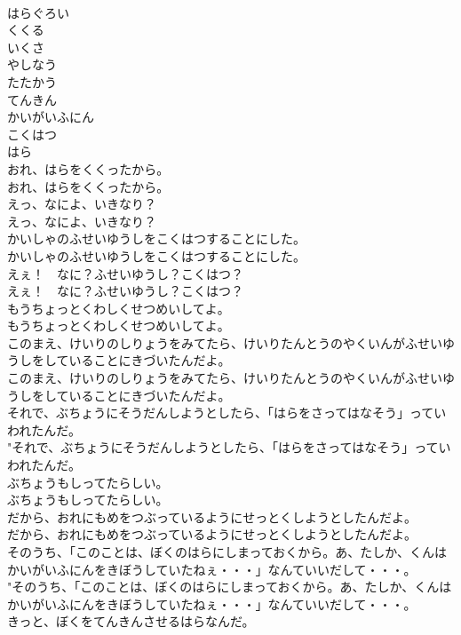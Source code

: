 \documentclass[8pt]{extreport}
\begin{document}
\begin{CJK}{UTF8}{min}
\\	はらぐろい
\\	くくる
\\	いくさ
\\	やしなう
\\	たたかう
\\	てんきん
\\	かいがいふにん
\\	こくはつ
\\	はら
\\	おれ、はらをくくったから。	
\\	おれ、はらをくくったから。 
\\	えっ、なによ、いきなり？	
\\	えっ、なによ、いきなり？ 
\\	かいしゃのふせいゆうしをこくはつすることにした。	
\\	かいしゃのふせいゆうしをこくはつすることにした。 
\\	えぇ！　なに？ふせいゆうし？こくはつ？	
\\	えぇ！　なに？ふせいゆうし？こくはつ？　 
\\	もうちょっとくわしくせつめいしてよ。	
\\	もうちょっとくわしくせつめいしてよ。 
\\	このまえ、けいりのしりょうをみてたら、けいりたんとうのやくいんがふせいゆうしをしていることにきづいたんだよ。	
\\	このまえ、けいりのしりょうをみてたら、けいりたんとうのやくいんがふせいゆうしをしていることにきづいたんだよ。 
\\	それで、ぶちょうにそうだんしようとしたら、「はらをさってはなそう」っていわれたんだ。	
\\	"それで、ぶちょうにそうだんしようとしたら、「はらをさってはなそう」っていわれたんだ。 
\\	ぶちょうもしってたらしい。	
\\	ぶちょうもしってたらしい。 
\\	だから、おれにもめをつぶっているようにせっとくしようとしたんだよ。	
\\	だから、おれにもめをつぶっているようにせっとくしようとしたんだよ。 
\\	そのうち、「このことは、ぼくのはらにしまっておくから。あ、たしか、くんはかいがいふにんをきぼうしていたねぇ・・・」なんていいだして・・・。	
\\	"そのうち、「このことは、ぼくのはらにしまっておくから。あ、たしか、くんはかいがいふにんをきぼうしていたねぇ・・・」なんていいだして・・・。 
\\	きっと、ぼくをてんきんさせるはらなんだ。	

\end{CJK}
\end{document}
